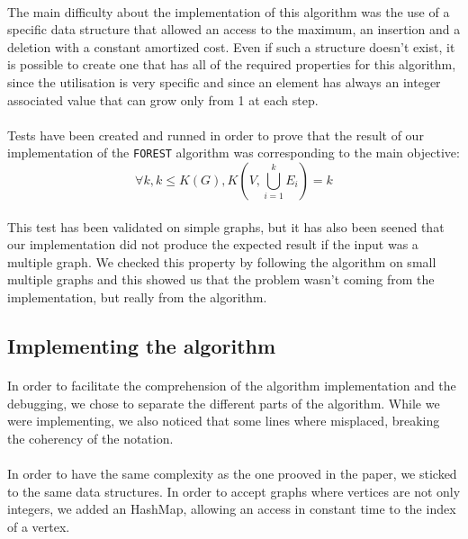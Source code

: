 \paragraph{}
The main difficulty about the implementation of this algorithm was the use of a
specific data structure that allowed an access to the maximum, an insertion and
a deletion with a constant amortized cost. Even if such a structure doesn't
exist, it is possible to create one that has all of the required properties for
this algorithm, since the utilisation is very specific and since an element has
always an integer associated value that can grow only from 1 at each step.


\paragraph{}
Tests have been created and runned in order to prove that the result of our
implementation of the \verb!FOREST! algorithm was corresponding to the main
objective:
$$\forall k, k \leq K(G),K(V,\bigcup \limits_{i=1}^k E_i) = k$$

\paragraph{}
This test has been validated on simple graphs, but it has also been seened that
our implementation did not produce the expected result if the input was a
multiple graph. We checked this property by following the algorithm on small
multiple graphs and this showed us that the problem wasn't coming from the
implementation, but really from the algorithm.

\subsection{Implementing the algorithm}
\paragraph{}
In order to facilitate the comprehension of the algorithm implementation and the
debugging, we chose to separate the different parts of the algorithm. While
we were implementing, we also noticed that some lines where misplaced, breaking
the coherency of the notation.

\paragraph{}
In order to have the same complexity as the one prooved in the paper, we sticked
to the same data structures. In order to accept graphs where vertices are not
only integers, we added an HashMap, allowing an access in constant time to the
index of a vertex.

